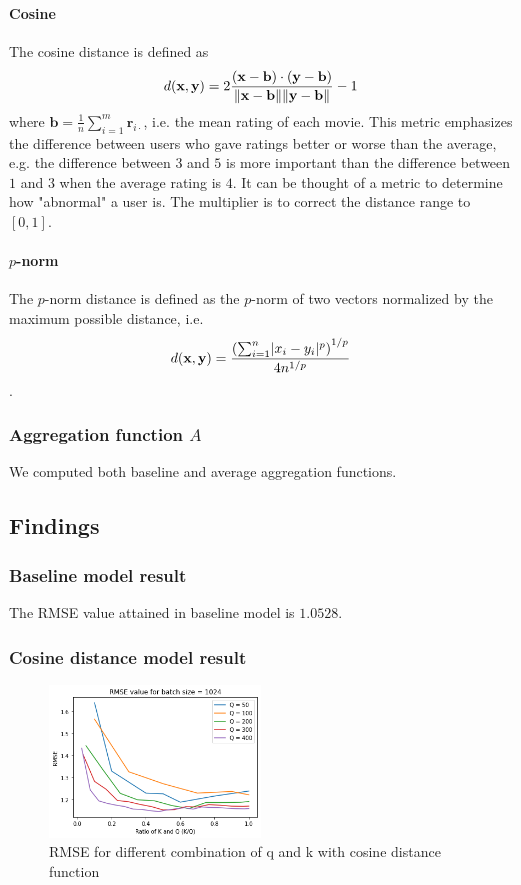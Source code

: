 \documentclass[final]{cvpr}
\newcommand{\Par}[1]{\left(#1\right)}
\DeclarePairedDelimiter{\abs}{|}{|}
\DeclarePairedDelimiter{\norm}{\lVert}{\rVert}
\begin{document}
\paragraph{Cosine}
The cosine distance is defined as
$$ d(\mathbf x, \mathbf y) = 2 \frac
{\Par{\mathbf x - \mathbf b} \cdot \Par{\mathbf y - \mathbf b}}
{\norm{\mathbf x - \mathbf b} \norm{\mathbf y - \mathbf b}} - 1 $$
where $\mathbf b = \frac1n \sum_{i=1}^m \mathbf r_{i\cdot}$,
i.e. the mean rating of each movie.
This metric emphasizes the difference between users who gave ratings better or worse than the average,
e.g. the difference between $3$ and $5$ is more important than the difference between $1$ and $3$
when the average rating is $4$.
It can be thought of a metric to determine how "abnormal" a user is.
The multiplier is to correct the distance range to $[0, 1]$.

\paragraph{$p$-norm}
The $p$-norm distance is defined as the $p$-norm of two vectors
normalized by the maximum possible distance, i.e.
$$ d(\mathbf x, \mathbf y) = \frac
{\Par{\sum_{i=1}^n \abs{x_i - y_i}^p}^{1/p}}
{4 n^{1/p}} $$.

\subsubsection{Aggregation function $A$}
We computed both baseline and average aggregation functions.

\subsection{Findings}

\subsubsection{Baseline model result}
The RMSE value attained in baseline model is $1.0528$.


\subsubsection{Cosine distance model result}
\begin{figure}[h]
	\includegraphics[width=0.5\textwidth]{knn-cosine-graph.png}
	\caption{RMSE for different combination of  q and k with cosine distance function}
	\label{fig:rmse-knn-QK}
\end{figure}
\end{document}
